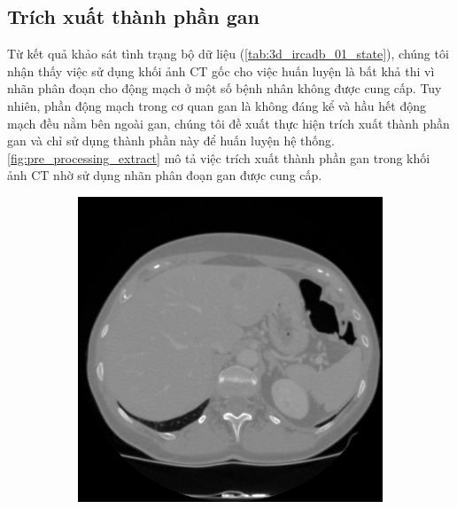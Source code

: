 \subsection{Trích xuất thành phần gan} 
\label{subsec:trich_xuat_thanh_phan_gan}
	Từ kết quả khảo sát tình trạng bộ dữ liệu (\autoref{tab:3d_ircadb_01_state}), chúng tôi nhận thấy việc sử dụng khối ảnh CT gốc cho việc huấn luyện là bất khả thi vì nhãn phân đoạn cho động mạch ở một số bệnh nhân không được cung cấp. Tuy nhiên, phần động mạch trong cơ quan gan là không đáng kể và hầu hết động mạch đều nằm bên ngoài gan, chúng tôi đề xuất thực hiện trích xuất thành phần gan và chỉ sử dụng thành phần này để huấn luyện hệ thống. \autoref{fig:pre_processing_extract} mô tả việc trích xuất thành phần gan trong khối ảnh CT nhờ sử dụng nhãn phân đoạn gan được cung cấp. 
	\begin{figure}[h!]
		\begin{subfigure}[b]{0.24\textwidth}
			\includegraphics[width=\textwidth]{figures/pre_processing_extract_dicom}
			\caption{}
			\label{fig:pre_processing_extract_dicom}
		\end{subfigure}
		\hfill
		\begin{subfigure}[b]{0.24\textwidth}

\end{subfigure}
\end{figure}
